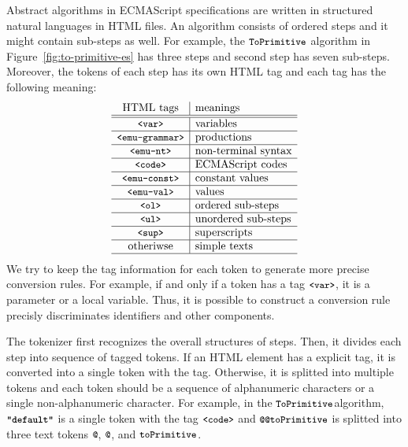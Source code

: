 Abstract algorithms in ECMAScript specifications are written in structured
natural languages in HTML files. An algorithm consists of ordered steps
and it might contain sub-steps as well. For example,
the \( \texttt{\small ToPrimitive} \) algorithm in Figure~\ref{fig:to-primitive-es}
has three steps and second step has seven sub-steps.
Moreover, the tokens of each step has its own HTML tag and each tag
has the following meaning:
\[
  \begin{array}{c|l}
    \text{HTML tags} & \text{meanings}\\\hline\hline
    \texttt{\small<var>} & \text{variables}\\\hline
    \texttt{\small<emu-grammar>} & \text{productions}\\\hline
    \texttt{\small<emu-nt>} & \text{non-terminal syntax}\\\hline
    \texttt{\small<code>} & \text{ECMAScript codes}\\\hline
    \texttt{\small<emu-const>} & \text{constant values}\\\hline
    \texttt{\small<emu-val>} & \text{values}\\\hline
    \texttt{\small<ol>} & \text{ordered sub-steps}\\\hline
    \texttt{\small<ul>} & \text{unordered sub-steps}\\\hline
    \texttt{\small<sup>} & \text{superscripts}\\\hline
    \text{otheriwse} & \text{simple texts}\\\hline
  \end{array}
\]
We try to keep the tag information for each token to generate more
precise conversion rules. For example, if and only if a token has a tag
\( \texttt{\small<var>} \), it is a parameter or a local variable.
Thus, it is possible to construct a conversion rule precisly discriminates
identifiers and other components.

The tokenizer first recognizes the overall structures of steps.
Then, it divides each step into sequence of tagged tokens.
If an HTML element has a explicit tag, it is converted into a single token
with the tag. Otherwise, it is splitted into multiple tokens and each token
should be a sequence of alphanumeric characters or a single
non-alphanumeric character. For example, in the \( \texttt{\small ToPrimitive} \)algorithm,
\( \textbf{\texttt{\small"default"}} \) is a single token with the tag \( \texttt{\small<code>} \)
and \( \code{@@toPrimitive} \) is splitted into three text tokens
\( \code{@} \), \( \code{@} \), and \( \texttt{\small toPrimitive} \).

